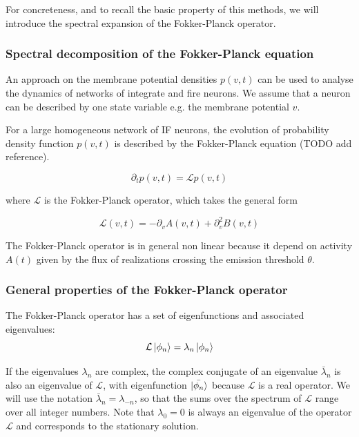 \documentclass[a4paper,11pt,twoside]{article}
\numberwithin{equation}{section}
\begin{document}
For concreteness, and to recall the basic property of this methods, we will introduce the spectral expansion of the Fokker-Planck operator.


\subsubsection{Spectral decomposition of the Fokker-Planck equation}
An approach on the membrane potential densities $p(v,t)$ can be used to analyse the dynamics of networks of integrate and fire neurons. We assume that a neuron can be described by one state variable e.g. the membrane potential $v$.

For a large homogeneous network of IF neurons, the evolution of probability density function $p(v,t)$ is described by the Fokker-Planck equation (TODO add reference).  

\begin{equation}
\label{eq:fokkerplanck}
\partial_t p(v,t)=\mathcal{L}p(v,t)
\end{equation}

where $\mathcal{L}$ is the Fokker-Planck operator, which takes the general form

\begin{equation}
\label{eq:Lfokker}
\mathcal{L}(v,t)=-\partial_v A(v,t) +\partial_v^2 B(v,t)
\end{equation}

The Fokker-Planck operator is in general non linear because it depend on activity $A(t)$ given by the flux of realizations crossing the emission threshold $\theta$.


\subsubsection{General properties of the Fokker-Planck operator}
The Fokker-Planck operator has a set of eigenfunctions and associated eigenvalues:
\begin{equation}
\label{eq:fokkerplanckoperator}
\mathcal{L}\ket{\phi_n}=\lambda_n\ket{\phi_n}
\end{equation}

If the eigenvalues $\lambda_n$ are complex, the complex conjugate of an eigenvalue  $\bar{\lambda}_n$  is also an eigenvalue of $\mathcal{L}$, with eigenfunction $\ket{\bar{\phi_n}}$ because $\mathcal{L}$ is a real operator. We will use the notation $\bar{\lambda}_n=\lambda_{-n}$, so that the sums over the spectrum of $\mathcal{L}$ range over all integer numbers. Note that $\lambda_0=0$ is always an eigenvalue of the operator $\mathcal{L}$ and corresponds to the stationary solution.
\end{document}
